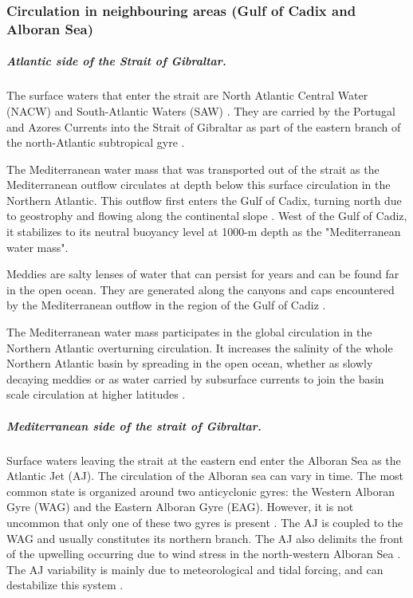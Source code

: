 \subsubsection{Circulation in neighbouring areas (Gulf of Cadix and Alboran Sea)}

\subparagraph{Atlantic side of the Strait of Gibraltar.}

The surface waters that enter the strait are North Atlantic Central Water (NACW) and South-Atlantic Waters (SAW) \citep{Millot2014,Naranjo2015}. They are carried by the Portugal and Azores Currents into the Strait of Gibraltar as part of the eastern branch of the north-Atlantic subtropical gyre \citep{barton_2001}.

The Mediterranean water mass that was transported out of the strait as the Mediterranean outflow circulates at depth below this surface circulation in the Northern Atlantic. This outflow first enters the Gulf of Cadix, turning north due to geostrophy and flowing along the continental slope \citep{price_1993,gasser_2017}. West of the Gulf of Cadiz, it stabilizes to its neutral buoyancy level at 1000-m depth as the "Mediterranean water mass"\citep{price_1993}.

Meddies are salty lenses of water that can persist for years and can be found far in the open ocean. They are generated along the canyons and caps encountered by the Mediterranean outflow in the region of the Gulf of Cadiz \citep{bashmachnikov_2015}. 

The Mediterranean water mass participates in the global circulation in the Northern Atlantic overturning circulation. It increases the salinity of the whole Northern Atlantic basin by spreading in the open ocean, whether as slowly decaying meddies or as water carried by subsurface currents to join the basin scale circulation at higher latitudes \citep{price_1993,jia_2007}.

\subparagraph{Mediterranean side of the strait of Gibraltar.} 

Surface waters leaving the strait at the eastern end enter the Alboran Sea as the Atlantic Jet (AJ). The circulation of the Alboran sea can vary in time. The most common state is organized around two anticyclonic gyres: the Western Alboran Gyre (WAG) and the Eastern Alboran Gyre (EAG). However, it is not uncommon that only one of these two gyres is present \citep{millot_2005}. The AJ is coupled to the WAG and usually constitutes its northern branch. The AJ also delimits the front of the upwelling occurring due to wind stress in the north-western Alboran Sea \citep{sarhan_2000}. The AJ variability is mainly due to meteorological and tidal forcing, and can destabilize this system \citep{sanchez-garrido_2013,lorente_2019}.

